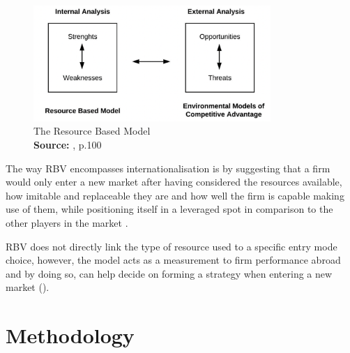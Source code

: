 \documentclass[11pt,a4paper]{article}
\newcommand*{\captionsource}[2]{%
  \caption[{#1}]{%
    #1%
    \\\hspace{\linewidth}%
    \textbf{Source:} #2%
  }%
}
\begin{document}
{{\begin{figure}[H]
	\centering
  \includegraphics[width=90mm]{figures/fig5_rbv_model}
  \vspace{5mm}
    \captionsetup{justification=centering,margin=2cm}
      \captionsource{The Resource Based Model}{\cite{barneyFirmResourcesSustained1991}, p.100}
	\label{fig:rbv_model}
\end{figure}


The way RBV encompasses internationalisation is by suggesting that a firm would only enter a new market after having considered the resources available, how imitable and replaceable they are and how well the firm is capable making use of them, while positioning itself in a leveraged spot in comparison to the other players in the market \parencite{ruzzierResourcebasedApproachInternationalisation2006}.  \par
RBV does not directly link the type of resource used to a specific entry mode choice, however, the model acts as a measurement to firm performance abroad and by doing so, can help decide on forming a strategy when entering a new market (\cite{tulungResourceAvailabilityFirm2017}). 
\newpage

\section{Methodology}
\vspace{-2mm}

}}
\end{document}
